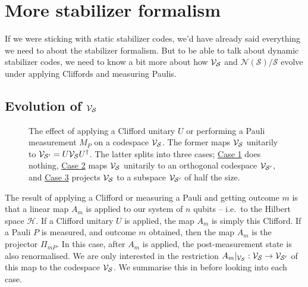 \section{More stabilizer formalism}\label{sec:more-stabilizer-formalism}

If we were sticking with static stabilizer codes, we'd have already said everything we need to about the stabilizer formalism.
But to be able to talk about dynamic stabilizer codes, we need to know a bit more about how $\mathcal{V}_{\mathcal{S}}$ and $\mathcal{N(S)/S}$ evolve under applying Cliffords and measuring Paulis.

\subsection{Evolution of $\mathcal{V}_{\mathcal{S}}$}\label{subsec:evolution-of-codespace}

\begin{figure}[tb!]
    \centering
    \caption{The effect of applying a Clifford unitary $U$ or performing a Pauli measurement $M_P$ on a codespace $\mathcal{V}_{\mathcal{S}}$.
    The former maps $\mathcal{V}_{\mathcal{S}}$ unitarily to $\mathcal{V}_{\mathcal{S}'} = U\mathcal{V}_{\mathcal{S}}U^\dagger$.
    The latter splits into three cases; \hyperref[thm:stabilizer_group_update_measurement:case1]{Case 1} does nothing, \hyperref[thm:stabilizer_group_update_measurement:case2]{Case 2} maps $\mathcal{V}_{\mathcal{S}}$ unitarily to an orthogonal codespace $\mathcal{V}_{\mathcal{S}'}$, and \hyperref[thm:stabilizer_group_update_measurement:case3]{Case 3} projects $\mathcal{V}_{\mathcal{S}}$ to a subspace $\mathcal{V}_{\mathcal{S}'}$ of half the size.}
    \label{fig:codespace_transformation}
\end{figure}

The result of applying a Clifford or measuring a Pauli and getting outcome $m$ is that a linear map $A_m$ is applied to our system of $n$ qubits -- i.e.\ to the Hilbert space $\mathcal{H}$.
If a Clifford unitary $U$ is applied, the map $A_m$ is simply this Clifford.
If a Pauli $P$ is measured, and outcome $m$ obtained, then the map $A_m$ is the projector $\Pi_{mP}$.
In this case, after $A_m$ is applied, the post-measurement state is also renormalised.
We are only interested in the restriction $A_m|_{\mathcal{V}_{\mathcal{S}}} : \mathcal{V}_{\mathcal{S}} \to \mathcal{V}_{\mathcal{S}'}$ of this map to the codespace $\mathcal{V}_{\mathcal{S}}$.
We summarise this in  before looking into each case.

